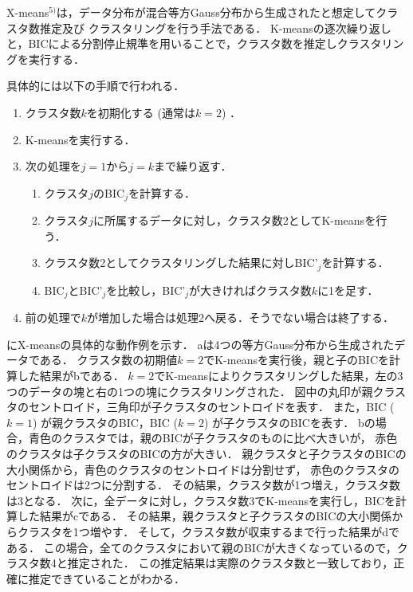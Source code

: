 X-means$^{5)}$は，データ分布が混合等方Gauss分布から生成されたと想定してクラスタ数推定及び
クラスタリングを行う手法である．
K-meansの逐次繰り返しと，BICによる分割停止規準を用いることで，クラスタ数を推定しクラスタリングを実行する．

具体的には以下の手順で行われる．
\begin{enumerate}
    \item クラスタ数$k$を初期化する (通常は$k=2$) ．
    \item K-meansを実行する．
    \item 次の処理を$j=1$から$j=k$まで繰り返す．
    \begin{enumerate}
        \item クラスタ$j$のBIC$_j$を計算する．
        \item クラスタ$j$に所属するデータに対し，クラスタ数2としてK-meansを行う．
        \item クラスタ数2としてクラスタリングした結果に対しBIC'$_j$を計算する．
        \item BIC$_j$とBIC'$_j$を比較し，BIC'$_j$が大きければクラスタ数$k$に1を足す．
    \end{enumerate}
    \item 前の処理で$k$が増加した場合は処理2へ戻る．そうでない場合は終了する．
\end{enumerate}

にX-meansの具体的な動作例を示す．
aは4つの等方Gauss分布から生成されたデータである．
クラスタ数の初期値$k=2$でK-meansを実行後，親と子のBICを計算した結果がbである．
$k=2$でK-meansによりクラスタリングした結果，左の3つのデータの塊と右の1つの塊にクラスタリングされた．
図中の丸印が親クラスタのセントロイド，三角印が子クラスタのセントロイドを表す．
また，BIC ($k=1$) が親クラスタのBIC，BIC ($k=2$) が子クラスタのBICを表す．
bの場合，青色のクラスタでは，親のBICが子クラスタのものに比べ大きいが，
赤色のクラスタは子クラスタのBICの方が大きい．
親クラスタと子クラスタのBICの大小関係から，青色のクラスタのセントロイドは分割せず，
赤色のクラスタのセントロイドは2つに分割する．
その結果，クラスタ数が1つ増え，クラスタ数は3となる．
次に，全データに対し，クラスタ数3でK-meansを実行し，BICを計算した結果がcである．
その結果，親クラスタと子クラスタのBICの大小関係からクラスタを1つ増やす．
そして，クラスタ数が収束するまで行った結果がdである．
この場合，全てのクラスタにおいて親のBICが大きくなっているので，クラスタ数4と推定された．
この推定結果は実際のクラスタ数と一致しており，正確に推定できていることがわかる．

